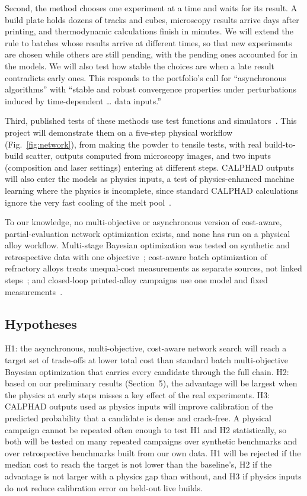 \documentclass[12pt,letterpaper]{article}
\begin{document}
Second, the method chooses one experiment at a time and waits for its result.
A build plate holds dozens of tracks and cubes, microscopy results arrive days
after printing, and thermodynamic calculations finish in minutes. We will
extend the rule to batches whose results arrive at different times, so that
new experiments are chosen while others are still pending, with the pending
ones accounted for in the models. We will also test how stable the choices are
when a late result contradicts early ones. This responds to the portfolio's
call for ``asynchronous algorithms'' with ``stable and robust convergence
properties under perturbations induced by time-dependent \ldots{} data
inputs.''

Third, published tests of these methods use test functions and
simulators~\cite{astudillo2021,buathong2024}. This project will demonstrate
them on a five-step physical workflow (Fig.~\ref{fig:network}), from making the powder to tensile
tests, with real build-to-build scatter,
outputs computed from microscopy images, and two inputs (composition and
laser settings) entering at different steps. CALPHAD outputs will also enter
the models as physics inputs, a test of physics-enhanced machine learning
where the physics is incomplete, since standard CALPHAD calculations ignore
the very fast cooling of the melt pool~\cite{debroy2018}.

To our knowledge, no multi-objective or asynchronous version of cost-aware,
partial-evaluation network optimization exists, and none has run on a
physical alloy workflow. Multi-stage Bayesian optimization was tested on
synthetic and retrospective data with one objective~\cite{torresi2026};
cost-aware batch optimization of refractory alloys treats unequal-cost
measurements as separate sources, not linked steps~\cite{alvi2026}; and
closed-loop printed-alloy campaigns use one model and fixed
measurements~\cite{talbot2026}.

\subsection{Hypotheses}
H1: the asynchronous, multi-objective, cost-aware network search will reach
a target set of trade-offs at lower total cost than standard batch
multi-objective Bayesian optimization that carries every candidate through
the full chain. H2: based on our preliminary results (Section~5), the
advantage will be largest when the physics at early steps misses a key
effect of the real experiments. H3: CALPHAD outputs used as physics inputs
will improve calibration of the predicted probability that a candidate is
dense and crack-free. A physical campaign
cannot be repeated often enough to test H1 and H2 statistically, so both
will be tested on many repeated campaigns over synthetic benchmarks and over
retrospective benchmarks built from our own data. H1 will be rejected if the
median cost to reach the target is not lower than the baseline's, H2 if the
advantage is not larger with a physics gap than without, and H3 if physics
inputs do not reduce calibration error on held-out live builds.
\end{document}
